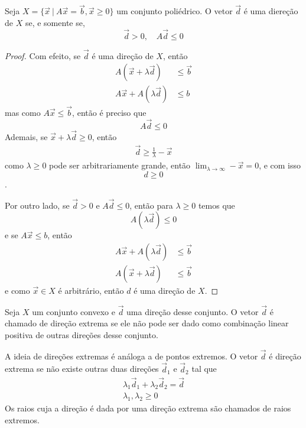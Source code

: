 \begin{prop:direção}
	Seja $X = \{\vec{x}\ |\ A\vec{x} = \vec{b}, \vec{x} \geq 0\}$ um conjunto poliédrico. O vetor $\vec{d}$ é uma diereção de $X$ se, e somente se, 
	\begin{equation*}
		\vec{d} > 0, \quad A\vec{d} \leq 0
	\end{equation*}
	
	\begin{proof}
		Com efeito, se $\vec{d}$ é uma direção de $X$, então
		\begin{align*}
			A (\vec{x} + \lambda \vec{d}) &\leq \vec{b} \\
			A \vec{x} + A (\lambda \vec{d}) & \leq b
		\end{align*}
		mas como $A \vec{x} \leq \vec{b}$, então é preciso que
		\begin{equation*}
			A\vec{d} \leq 0
		\end{equation*}
		Ademais, se $\vec{x} + \lambda \vec{d} \geq 0$, então
		\begin{align}
			\vec{d} \geq \frac{1}{\lambda} -\vec{x}
		\end{align}
		como $\lambda \geq 0$ pode ser arbitrariamente grande, então
		$\lim_{\lambda \to \infty} -\vec{x} = 0$, e com isso
		\[d \geq 0\].
		
		Por outro lado, se $\vec{d} > 0$ e $A \vec{d} \leq 0$, então para $\lambda \geq 0$ temos que
		\[A (\lambda \vec{d}) \leq 0\]
		e se $A \vec{x} \leq b$, então
		\begin{align*}
			A \vec{x} + A (\lambda \vec{d}) &\leq \vec{b} \\
			A (\vec{x} + \lambda \vec{d}) &\leq \vec{b}
		\end{align*}
		e como $\vec{x} \in X$ é arbitrário, então $d$ é uma direção de $X$.
	\end{proof} 
\end{prop:direção}

\begin{def:direção extrema}
	Seja $X$ um conjunto convexo e $\vec{d}$ uma direção desse conjunto. O vetor $\vec{d}$ é chamado de direção extrema se ele não pode ser dado como combinação linear positiva de outras direções desse conjunto.
\end{def:direção extrema}

A ideia de direções extremas é análoga a de pontos extremos. O vetor $\vec{d}$ é direção extrema se não existe outras duas direções $\vec{d}_1$ e $\vec{d}_2$ tal que
\begin{gather*}
	\lambda_1\vec{d}_1 + \lambda_2\vec{d}_2 = \vec{d} \\
	\lambda_1, \lambda_2 \geq 0
\end{gather*}
Os raios cuja a direção é dada por uma direção extrema são chamados de raios extremos.

